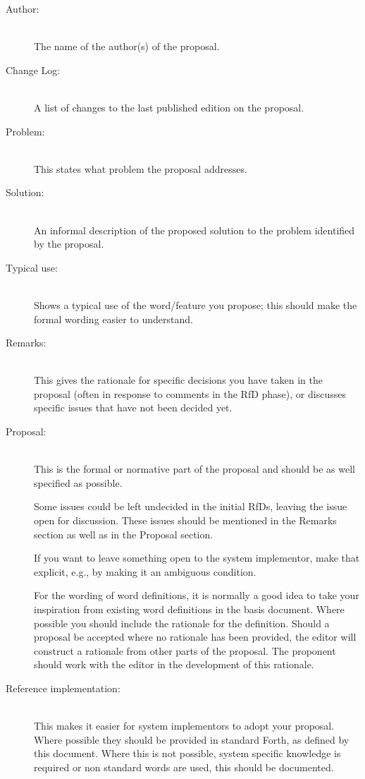 \begin{description}
\item[Author:] ~\\
	The name of the author(s) of the proposal.

\item[Change Log:] ~\\
	A list of changes to the last published edition on the proposal.

\item[Problem:] ~\\
	This states what problem the proposal addresses.

\item[Solution:] ~\\
	An informal description of the proposed solution to the problem
	identified by the proposal.

\item[Typical use:] ~\\
	Shows a typical use of the word/feature you propose; this should
	make the formal wording easier to understand.

\item[Remarks:] ~\\
	This gives the rationale for specific decisions you have taken in
	the proposal (often in response to comments in the RfD phase), or
	discusses specific issues that have not been decided yet.

\item[Proposal:] ~\\
	This is the formal or normative part of the proposal and should be
	as well specified as possible.

	Some issues could be left undecided in the initial RfDs, leaving
	the issue open for discussion.  These issues should be mentioned
	in the Remarks section as well as in the Proposal section.

	If you want to leave something open to the system implementor, make
	that explicit, e.g., by making it an ambiguous condition.

	For the wording of word definitions, it is normally a good idea to
	take your inspiration from existing word definitions in the basis
	document.  Where possible you should include the rationale for the
	definition.  Should a proposal be accepted where no rationale has
	been provided, the editor will construct a rationale from other
	parts of the proposal.  The proponent should work with the editor
	in the development of this rationale.

\item[Reference implementation:] ~\\
	This makes it easier for system implementors to adopt your proposal.
	Where possible they should be provided in standard Forth, as defined
	by this document.
	Where this is not possible, system specific knowledge is required or
	non standard words are used, this should be documented.


\end{description}
